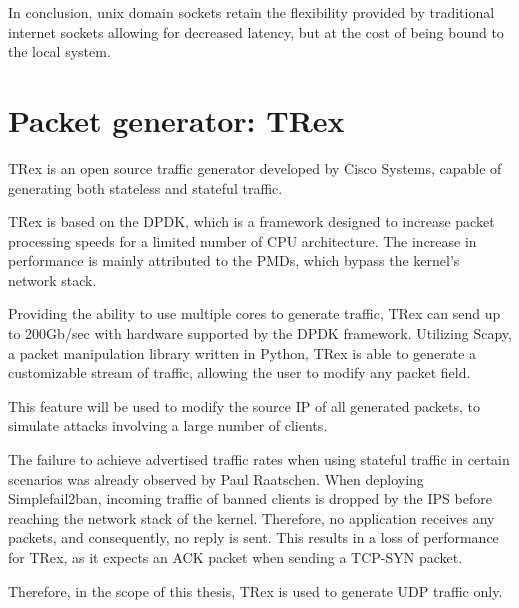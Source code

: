 In conclusion, unix domain sockets retain the flexibility provided by traditional internet sockets allowing for decreased latency, but at the cost of being bound to the local system.

\section{Packet generator: TRex}
TRex is an open source traffic generator developed by Cisco Systems, capable of generating both stateless and stateful traffic\cite{trex}.

TRex is based on the \ac{DPDK}, which is a framework designed to increase packet processing speeds for a limited number of \ac{CPU} architecture.
The increase in performance is mainly attributed to the \ac{PMDs}, which bypass the kernel's network stack.\cite{dpdk}

Providing the ability to use multiple cores to generate traffic, TRex can send up to 200Gb/sec with hardware supported by the \ac{DPDK} framework.
Utilizing Scapy, a packet manipulation library written in Python\cite{scapy}, TRex is able to generate a customizable stream of traffic, allowing the user to modify any packet field.\cite{trex}

This feature will be used to modify the source \ac{IP} of all generated packets, to simulate attacks involving a large number of clients.

The failure to achieve advertised traffic rates when using stateful traffic in certain scenarios was already observed by Paul Raatschen.
When deploying Simplefail2ban, incoming traffic of banned clients is dropped by the \ac{IPS} before reaching the network stack of the kernel.
Therefore, no application receives any packets, and consequently, no reply is sent.
This results in a loss of performance for TRex, as it expects an \ac{ACK} packet when sending a \ac{TCP-SYN} packet.\cite{raatschen:ipc}

Therefore, in the scope of this thesis, TRex is used to generate \ac{UDP} traffic only.
